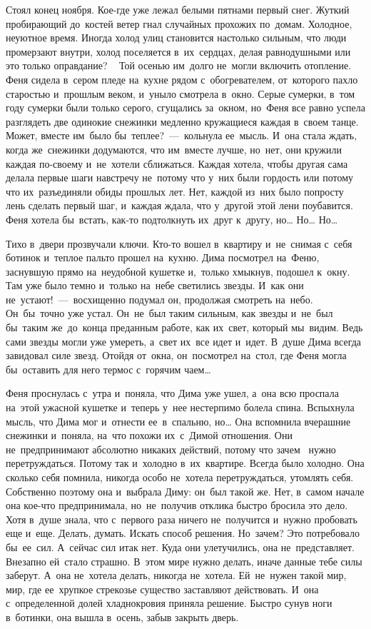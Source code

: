 Стоял конец ноября.
Кое-где уже лежал белыми пятнами первый снег.
Жуткий пробирающий до~костей ветер гнал случайных прохожих по~домам.
Холодное, неуютное время.
Иногда холод улиц становится настолько сильным, что люди промерзают внутри, холод поселяется в~их~сердцах, делая равнодушными или это только оправдание? 
~
Той осенью им~долго не~могли включить отопление.
Феня сидела в~сером пледе на~кухне рядом с~обогревателем, от~которого пахло старостью и~прошлым веком, и~уныло смотрела в~окно.
Серые сумерки, в~том году сумерки были только серого, сгущались за~окном, но~Феня все равно успела разглядеть две одинокие снежинки медленно кружащиеся каждая в~своем танце.
Может, вместе им~было бы~теплее?~---~кольнула ее~мысль.
И~она стала ждать, когда же~снежинки додумаются, что им~вместе лучше, но~нет, они кружили каждая по-своему и~не~хотели сближаться.
Каждая хотела, чтобы другая сама делала первые шаги навстречу не~потому что у~них были гордость или потому что их~разъединяли обиды прошлых лет.
Нет, каждой из~них было попросту лень сделать первый шаг, и~каждая ждала, что у~другой этой лени поубавится.
Феня хотела бы~встать, как-то подтолкнуть их~друг к~другу, но… Но… Но…
 
Тихо в~двери прозвучали ключи.
Кто-то вошел в~квартиру и~не~снимая с~себя ботинок и~теплое пальто прошел на~кухню.
Дима посмотрел на~Феню, заснувшую прямо на~неудобной кушетке и,~только хмыкнув, подошел к~окну.
Там уже было темно и~только на~небе светились звезды.
И~как они не~устают!~---~восхищенно подумал он, продолжая смотреть на~небо.
Он~бы~точно уже устал.
Он~не~был таким сильным, как звезды и~не~был бы~таким же~до~конца преданным работе, как их~свет, который мы~видим.
Ведь сами звезды могли уже умереть, а~свет их~все идет и~идет.
В~душе Дима всегда завидовал силе звезд.
Отойдя от~окна, он~посмотрел на~стол, где Феня могла бы~оставить для него термос с~горячим чаем…
 
Феня проснулась с~утра и~поняла, что Дима уже ушел, а~она всю проспала на~этой ужасной кушетке и~теперь у~нее нестерпимо болела спина.
Вспыхнула мысль, что Дима мог и~отнести ее~в~спальню, но… Она вспомнила вчерашние снежинки и~поняла, на~что похожи их~с~Димой отношения.
Они не~предпринимают абсолютно никаких действий, потому что зачем ~нужно перетруждаться.
Потому так и~холодно в~их~квартире.
Всегда было холодно.
Она сколько себя помнила, никогда особо не~хотела перетруждаться, утомлять себя.
Собственно поэтому она и~выбрала Диму: он~был такой же.
Нет, в~самом начале она кое-что предпринимала, но~не~получив отклика быстро бросила это дело.
Хотя в~душе знала, что с~первого раза ничего не~получится и~нужно пробовать еще и~еще.
Делать, думать.
Искать способ решения.
Но~зачем? Это потребовало бы~ее~сил.
А~сейчас сил итак нет.
Куда они улетучились, она не~представляет.
Внезапно ей~стало страшно.
В~этом мире нужно делать, иначе данные тебе силы заберут.
А~она не~хотела делать, никогда не~хотела.
Ей~не~нужен такой мир, мир, где ее~хрупкое стрекозье существо заставляют действовать.
И~она с~определенной долей хладнокровия приняла решение.
Быстро сунув ноги в~ботинки, она вышла в~осень, забыв закрыть дверь.

